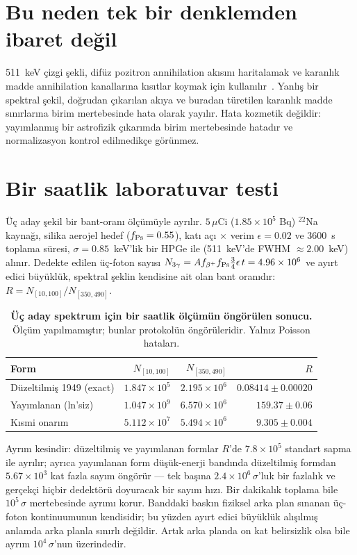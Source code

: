 \documentclass[twocolumn]{svjour3}
\begin{document}
\section{Bu neden tek bir denklemden ibaret değil}
511~keV çizgi şekli, difüz pozitron annihilation akısını haritalamak ve
karanlık madde annihilation kanallarına kısıtlar koymak için
kullanılır~\cite{sy26,yoneda25}. Yanlış bir spektral şekil, doğrudan
çıkarılan akıya ve buradan türetilen karanlık madde sınırlarına birim
mertebesinde hata olarak yayılır. Hata kozmetik değildir: yayımlanmış bir
astrofizik çıkarımda birim mertebesinde hatadır ve normalizasyon
kontrol edilmedikçe görünmez.

\section{Bir saatlik laboratuvar testi}
Üç aday şekil bir bant-oranı ölçümüyle ayrılır. $5\,\mu$Ci
($1.85\times10^5$ Bq) $^{22}$Na kaynağı, silika aerojel hedef
($f_{\rm Ps} = 0.55$), katı açı $\times$ verim $\epsilon = 0.02$ ve
$3600$~s toplama süresi, $\sigma = 0.85$~keV'lik bir HPGe ile
(511~keV'de FWHM $\approx 2.00$~keV) alınır. Dedekte edilen üç-foton
sayısı
$N_{3\gamma} = A f_{\beta^+} f_{\rm Ps} \tfrac{3}{4}\epsilon\,t = 4.96\times 10^{6}$
ve ayırt edici büyüklük, spektral şeklin kendisine ait olan bant oranıdır:
$R = N_{[10,100]}/N_{[350,490]}$.

\begin{table}[!htbp]
\centering\scriptsize
\setlength{\tabcolsep}{1.5pt}
\caption{\textbf{Üç aday spektrum için bir saatlik ölçümün öngörülen sonucu.}
Ölçüm yapılmamıştır; bunlar protokolün öngörüleridir. Yalnız Poisson
hataları.}
\label{tab:na22}
\vspace{0.1cm}
\begin{tabular}{@{}lrrr@{}}
\toprule
Form & $N_{[10,100]}$ & $N_{[350,490]}$ & $R$ \\
\midrule
Düzeltilmiş 1949 (exact) & $1.847\times 10^{5}$ & $2.195\times 10^{6}$ & $0.08414\pm 0.00020$ \\
Yayımlanan (ln'siz) & $1.047\times 10^{9}$ & $6.570\times 10^{6}$ & $159.37\pm 0.06$ \\
Kısmi onarım & $5.112\times 10^{7}$ & $5.494\times 10^{6}$ & $9.305\pm 0.004$ \\
\bottomrule
\end{tabular}
\end{table}

Ayrım kesindir: düzeltilmiş ve yayımlanan formlar $R$'de
$7.8\times 10^{5}$ standart sapma ile ayrılır; ayrıca yayımlanan form
düşük-enerji bandında düzeltilmiş formdan $5.67\times 10^{3}$ kat fazla
sayım öngörür --- tek başına $2.4\times10^{6}\,\sigma$'luk bir fazlalık ve
gerçekçi hiçbir dedektörü doyuracak bir sayım hızı. Bir dakikalık
toplama bile $10^{5}\,\sigma$ mertebesinde ayrımı korur. Banddaki
baskın fiziksel arka plan sınanan üç-foton kontinuumunun kendisidir;
bu yüzden ayırt edici büyüklük alışılmış anlamda arka planla
sınırlı değildir. Artık arka planda on kat belirsizlik olsa bile ayrım
$10^{4}\,\sigma$'nun üzerindedir.
\end{document}
